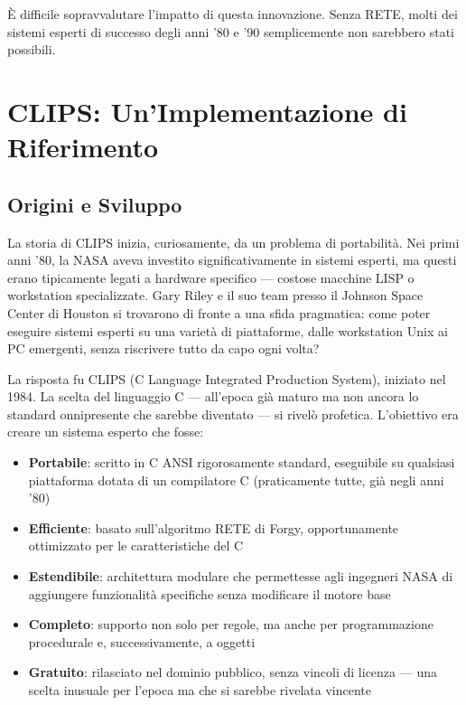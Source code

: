 È difficile sopravvalutare l'impatto di questa innovazione. Senza RETE, molti dei sistemi esperti di successo degli anni '80 e '90 semplicemente non sarebbero stati possibili.

\section{CLIPS: Un'Implementazione di Riferimento}

\subsection{Origini e Sviluppo}

La storia di CLIPS inizia, curiosamente, da un problema di portabilità. Nei primi anni '80, la NASA aveva investito significativamente in sistemi esperti, ma questi erano tipicamente legati a hardware specifico — costose macchine LISP o workstation specializzate. Gary Riley e il suo team presso il Johnson Space Center di Houston si trovarono di fronte a una sfida pragmatica: come poter eseguire sistemi esperti su una varietà di piattaforme, dalle workstation Unix ai PC emergenti, senza riscrivere tutto da capo ogni volta?

La risposta fu CLIPS (C Language Integrated Production System), iniziato nel 1984. La scelta del linguaggio C — all'epoca già maturo ma non ancora lo standard onnipresente che sarebbe diventato — si rivelò profetica. L'obiettivo era creare un sistema esperto che fosse:

\begin{itemize}
\item \textbf{Portabile}: scritto in C ANSI rigorosamente standard, eseguibile su qualsiasi piattaforma dotata di un compilatore C (praticamente tutte, già negli anni '80)
\item \textbf{Efficiente}: basato sull'algoritmo RETE di Forgy, opportunamente ottimizzato per le caratteristiche del C
\item \textbf{Estendibile}: architettura modulare che permettesse agli ingegneri NASA di aggiungere funzionalità specifiche senza modificare il motore base
\item \textbf{Completo}: supporto non solo per regole, ma anche per programmazione procedurale e, successivamente, a oggetti
\item \textbf{Gratuito}: rilasciato nel dominio pubblico, senza vincoli di licenza — una scelta inusuale per l'epoca ma che si sarebbe rivelata vincente
\end{itemize}

